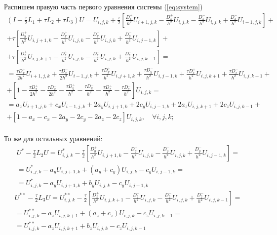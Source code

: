 \documentclass[a4paper,12pt]{article}
\begin{document}
Распишем правую часть первого уравнения системы (\ref{eq:system})
\begin{multline*}
  \left( I + \frac{\tau}{2} L_1 +  \tau L_2 + \tau L_3 \right) U
  = U_{i,j,k} + \frac{\tau}{2} \left[\frac{D^+_x}{h^2}U_{i+1,j,k} - \frac{D^+_x}{h^2}U_{i,j,k} - \frac{D^-_x}{h^2} U_{i,j,k} + \frac{D^-_x}{h^2}U_{i-1,j,k} \right] +  \\
  + \tau \left[\frac{D^+_y}{h^2}U_{i,j+1,k} - \frac{D^+_y}{h^2}U_{i,j,k} - \frac{D^-_y}{h^2} U_{i,j,k} + \frac{D^-_y}{h^2}U_{i,j-1,k}  \right] + \\
  + \tau \left[ \frac{D^+_z}{h^2}U_{i,j,k+1} - \frac{D^+_z}{h^2}U_{i,j,k} - \frac{D^-_z}{h^2} U_{i,j,k} + \frac{D^-_z}{h^2}U_{i,j,k-1} \right] = \\
  = \frac{\tau D^+_x}{2h^2} U_{i+1,j,k} + \frac{\tau D^-_x}{2h^2} U_{i-1,j,k} + \frac{\tau D^+_y}{h^2} U_{i,j+1,k} + \frac{\tau D^-_y}{h^2} U_{i,j-1,k} + \frac{\tau D^+_z}{h^2} U_{i,j,k+1} + \frac{\tau D^-_z}{h^2} U_{i,j,k-1} + \\
  + \left[ 1 - \frac{\tau D^+_x}{2h^2} - \frac{\tau D^-_x}{2h^2} - \frac{\tau D^+_y}{h^2} - \frac{\tau D^-_y}{h^2} - \frac{\tau D^+_z}{h^2} - \frac{\tau D^-_z}{h^2} \right] U_{i,j,k} = \\
  = a_x U_{i+1,j,k} + c_x U_{i-1,j,k} + 2a_y U_{i,j+1,k} + 2c_y U_{i,j-1,k} + 2a_z U_{i,j,k+1} + 2c_z U_{i,j,k-1} + \\
  + \left[ 1 - a_x - c_x - 2a_y - 2c_y - 2a_z - 2c_z \right] U_{i,j,k} , \quad \forall i,j,k; \\
\end{multline*}

То же для остальных уравнений:
\begin{multline*}
  U^{*} - \frac{\tau}{2} L_2 U = U^{*}_{i,j,k} - \frac{\tau}{2} \left[ \frac{D^+_y}{h^2}U_{i,j+1,k} - \frac{D^+_y}{h^2}U_{i,j,k} - \frac{D^-_y}{h^2} U_{i,j,k} + \frac{D^-_y}{h^2}U_{i,j-1,k} \right] = \\
  = U^{*}_{i,j,k} - a_y U_{i,j+1,k} + \left( a_y + c_y \right) U_{i,j,k}  - c_y U_{i,j-1,k} = \\
  = U^{*}_{i,j,k} - a_y U_{i,j+1,k} + b_y U_{i,j,k}  - c_y U_{i,j-1,k}
\end{multline*}
\begin{multline*}
  U^{**} - \frac{\tau}{2} L_3 U = U^{**}_{i,j,k} - \frac{\tau}{2} \left[ \frac{D^+_z}{h^2}U_{i,j,k+1} - \frac{D^+_z}{h^2}U_{i,j,k} - \frac{D^-_z}{h^2} U_{i,j,k} + \frac{D^-_z}{h^2}U_{i,j,k-1} \right] = \\
  = U^{**}_{i,j,k} - a_z U_{i,j,k+1}  + \left( a_z + c_z \right) U_{i,j,k} - c_z U_{i,j,k-1} = \\
  = U^{**}_{i,j,k} - a_z U_{i,j,k+1}  + b_z U_{i,j,k} - c_z U_{i,j,k-1}
\end{multline*}
\end{document}

